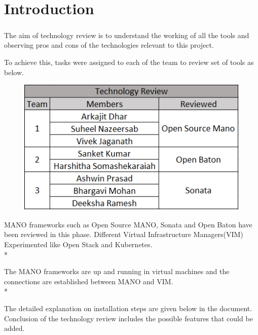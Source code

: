 \chapter{Introduction}
\label{ch:Introduction}

\paragraph{ }The aim of technology review is to understand the working of all the tools and observing pros and cons of the technologies relevant to this project.

To achieve this, tasks were assigned to each of the team to review set of tools as below. 

\begin{figure} [h]
\centering
\includegraphics[width=.5\linewidth]{figures/teams}
\end{figure}

MANO frameworks such as Open Source MANO, Sonata and Open Baton have been reviewed in this phase. Different Virtual Infrastructure Managers(VIM) Experimented like Open Stack and Kubernetes.\\*

The MANO frameworks are up and running in virtual machines and the connections are established between MANO and VIM.\\*

The detailed explanation on installation steps are given below in the document. Conclusion of the technology review includes the possible features that could be added.



